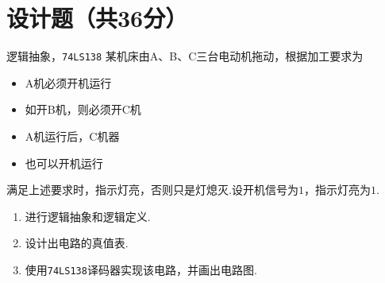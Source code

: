 \section{设计题（共36分）}
\begin{exercise}[16]{逻辑抽象，\texttt{74LS138}}
    某机床由A、B、C三台电动机拖动，根据加工要求为
    \begin{itemize}
        \item A机必须开机运行
        \item 如开B机，则必须开C机
        \item A机运行后，C机器
        \item 也可以开机运行
    \end{itemize}
    满足上述要求时，指示灯亮，否则只是灯熄灭.设开机信号为$1$，指示灯亮为$1$.
\begin{enumerate}
    \item 进行逻辑抽象和逻辑定义.
    \item 设计出电路的真值表.
    \item 使用\texttt{74LS138}译码器实现该电路，并画出电路图.
\end{enumerate}
\end{exercise}
